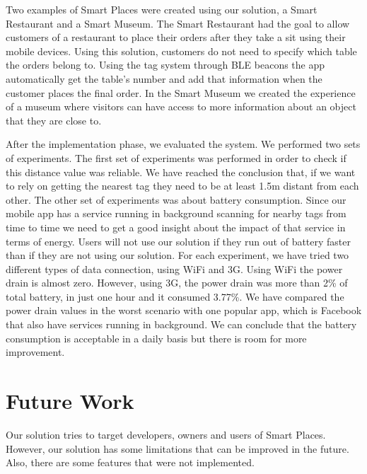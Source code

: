 Two examples of Smart Places were created using our solution, a Smart Restaurant and a Smart Museum.
The Smart Restaurant had the goal to allow customers of a restaurant to place their orders after they take a sit using their mobile devices.
Using this solution, customers do not need to specify which table the orders belong to. Using the tag system through \gls{BLE} beacons the app automatically get the table's number and add that information when the customer places the final order.
In the Smart Museum we created the experience of a museum where visitors can have access to more information about an object that they are close to.

After the implementation phase, we evaluated the system.
We performed two sets of experiments.
The first set of experiments was performed in order to check if this distance value was reliable.
We have reached the conclusion that, if we want to rely on getting the nearest tag they need to be at least 1.5m distant from each other.
The other set of experiments was about battery consumption.
Since our mobile app has a service running in background scanning for nearby tags from time to time we need to get a good insight about the impact of that service in terms of energy.
Users will not use our solution if they run out of battery faster than if they are not using our solution.
For each experiment, we have tried two different types of data connection, using \gls{WiFi} and \gls{3G}.
Using \gls{WiFi} the power drain is almost zero.
However, using \gls{3G}, the power drain was more than 2\% of total battery, in just one hour and it consumed 3.77\%.
We have compared the power drain values in the worst scenario with one popular app, which is Facebook that also have services running in background.
We can conclude that the battery consumption is acceptable in a daily basis but there is room for more improvement.

\section{Future Work}
\label{sec:conclusion_future_work}
Our solution tries to target developers, owners and users of Smart Places.
However, our solution has some limitations that can be improved in the future.
Also, there are some features that were not implemented.

